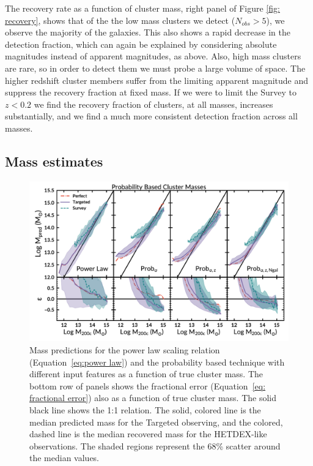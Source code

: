 \documentclass[fleqn,usenatbib]{mnras}
\begin{document}
The recovery rate as a function of cluster mass, right panel of Figure \ref{fig: recovery}, shows that of the the low mass clusters we detect ($N_{obs} >5$), we observe the majority of the galaxies. This also shows a rapid decrease in the detection fraction, which can again be explained by considering absolute magnitudes instead of apparent magnitudes, as above. Also, high mass clusters are rare, so in order to detect them we must probe a large volume of space. The higher redshift cluster members suffer from the limiting apparent magnitude and suppress the recovery fraction at fixed mass. If we were to limit the Survey to $z<0.2$ we find the recovery fraction of clusters, at all masses, increases substantially, and we find a much more consistent detection fraction across all masses.

\subsection{Mass estimates}
\begin{figure} 
	\includegraphics[width=\textwidth]{figures/Probcomparison.pdf} 
	\caption{Mass predictions for the power law scaling relation (Equation~\ref{eq:power law}) and the probability based technique with different input features as a function of true cluster mass. The bottom row of panels shows the fractional error (Equation~\ref{eq: fractional error}) also as a function of true cluster mass. The solid black line shows the 1:1 relation. The solid, colored line is the median predicted mass for the Targeted observing, and the colored, dashed line is the median recovered mass for the HETDEX-like observations. The shaded regions represent the 68\% scatter around the median values.} \label{fig:Probability comparison} 
\end{figure}
\end{document}
